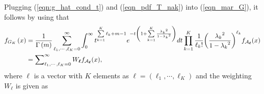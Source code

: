 \documentclass[12pt,onecolumn,draftcls]{IEEEtran}
\newcommand{\bs}{\boldsymbol}
\begin{document}
Plugging (\ref{eqn:g_hat_cond_t}) and (\ref{eqn_pdf_T_nak}) into (\ref{eqn_mar_G}), it follows by using \cite[Eq.3.381.4]{gradshteyn1965table} that
\begin{align}\label{eqn_pdf_f_g_1_p}
{f_{ G_K}}\left( x \right)
 &= \frac{1}{{\Gamma \left( m \right)}}\sum\limits_{{\ell_1}, \cdots ,{\ell_K} = 0}^\infty  {\int\nolimits_0^\infty  {{t^{\sum\limits_{k = 1}^K {{\ell_k}}  + m - 1}}{e^{ - t\left( {1 + \sum\limits_{k = 1}^K {\frac{{{\lambda _k}^2}}{{1 - {\lambda _k}^2}}} } \right)}}dt} \prod\limits_{k = 1}^K {\frac{1}{{{\ell_k}!}}{{{{\left( {\frac{{{\lambda _k}^2}}{{1 - {\lambda _k}^2}}} \right)}^{{\ell_k}}}}}{f_{{{ {\mathcal A}}_{\bs{\ell}}}}}(x)} } \notag\\
 &= \sum\nolimits_{{\ell_1}, \cdots ,{\ell_K} = 0}^\infty  {{W_{\bs{\ell}}}{f_{{{ {\mathcal A}}_{\bs{\ell}}}}}(x)},
\end{align}
where ${{\bs{\ell}}}$ is a vector with $K$ elements as ${{\bs{\ell}}} = (\ell_1,\cdots,\ell_K)$ and the weighting ${W_{\bs{\ell}}}$ is given as
\end{document}
